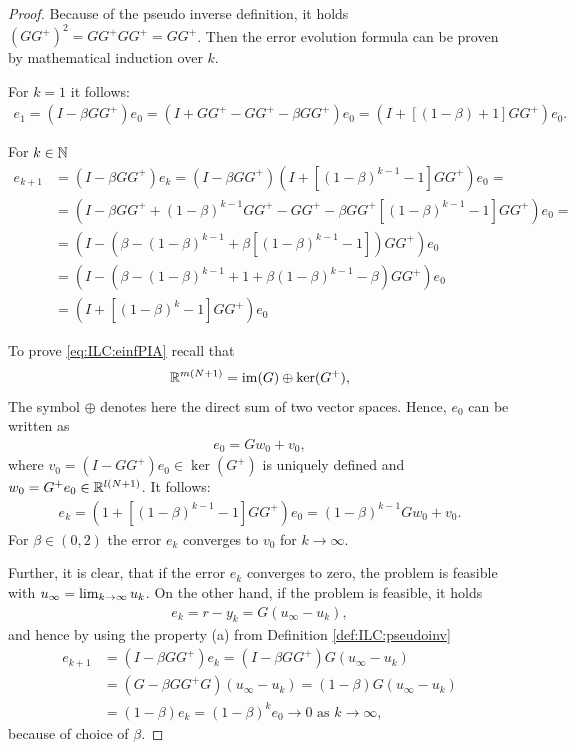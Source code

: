 \begin{proof}
	Because of the pseudo inverse definition, it holds
	$(GG^+)^2 = GG^+GG^+ = GG^+$.  Then the error evolution formula can be proven by mathematical induction over $k$. 
	
	For $k = 1$ it follows: 
	\begin{align*}
	e_1 = (I - \beta G G^+)e_0 = (I + GG^+ - GG^+ - \beta G G^+)e_0 = (I + \left[(1 - \beta) + 1\right]GG^+)e_0.
	\end{align*}
	
	For $k \in {\mathbb{N}}$  
	\begin{align*}
	e_{k+1} &= ( I - \beta G G^+)e_k = ( I - \beta G G^+) (I+  \left[(1-\beta)^{k-1} - 1\right] G G^+) e_0 = \\
	& = \left(I - \beta G G^+ + (1-\beta)^{k-1}GG^+ - GG^+ - \beta GG^+\left[(1 - \beta)^{k-1} - 1\right]GG^+\right)e_0=\\
	& = \left(I - (\beta - (1-\beta)^{k-1} + \beta\left[(1 - \beta)^{k-1} - 1\right])G G^+\right)e_0\\
	& = \left(I - \left(\beta - (1-\beta)^{k-1} + 1 + \beta(1-\beta)^{k-1} - \beta\right)GG^+\right)e_0\\
	& = (I+  \left[(1-\beta)^k - 1\right] G G^+) e_0
	\end{align*}
	         
	To prove \eqref{eq:ILC:einfPIA}  recall that 
	\begin{align*}
	{\mathbb{R}}^{m(N+1)} = \operatorname{im}(G)\oplus \ker (G^+),
	\end{align*}
	The symbol $\oplus$ denotes here the direct sum of two vector spaces. %
	Hence, $e_0$ can be written as 
	\begin{align*}  
	e_0 = G w_0 + v_0,
	\end{align*}
	where $v_0 = (I - G G^+)e_0 \in \ker (G^+)$  is uniquely defined and $w_0 = G^+ e_0 \in {\mathbb{R}}^{l(N+1)}$. It follows: 
	\begin{align*}
	e_{k} = (1+ \left[(1 - \beta)^{k-1} - 1\right]GG^+)e_0 = (1-\beta)^{k-1} G w_0 + v_0.
	\end{align*}
	For $\beta \in (0,2)$ the error $e_k$ converges to $v_0$ for $k \to \infty$. 
	
	
	Further, it is clear, that if the error $e_k$ converges to zero, the problem is feasible with $u_\infty = \lim_{k \to \infty} u_k$. On the other hand, if the problem is feasible, it holds
	\begin{align}
	e_k = r - y_k = G(u_\infty - u_k), 
	\end{align}
	and hence by using the property (a) from Definition \ref{def:ILC:pseudoinv}
	\begin{subequations}
	\begin{align}
	e_{k+1} &= (I- \beta G G^+) e_k = (I- \beta G G^+) G(u_\infty - u_k)
	\\
	&= (G - \beta G G^+ G)(u_\infty - u_k) = (1 - \beta)G(u_\infty - u_k) 
	\\
	&= (1- \beta) e_k = (1 - \beta)^k e_0 \to 0 \text{ as } k \to \infty,
	\end{align}
	\end{subequations}
	because of choice of $\beta$. 
\end{proof}

